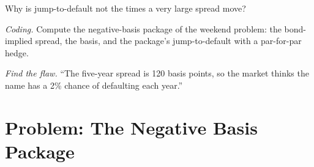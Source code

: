 \begin{exercise}[$\star\star$]\label{exo:rc:reduced-form-credit:6}
Why is jump-to-default not the  times a very large spread move?
\end{exercise}

\begin{exercise}[$\star\star\star$]\label{exo:rc:reduced-form-credit:7}
\emph{Coding.} Compute the negative-basis package of the weekend problem: the
bond-implied spread, the basis, and the package's jump-to-default with a par-for-par
hedge.
\end{exercise}

\begin{exercise}[$\star\star\star$]\label{exo:rc:reduced-form-credit:8}
\emph{Find the flaw.} ``The five-year spread is 120 basis points, so the market thinks
the name has a 2\% chance of defaulting each year.''
\end{exercise}

\section{Problem: The Negative Basis Package}

